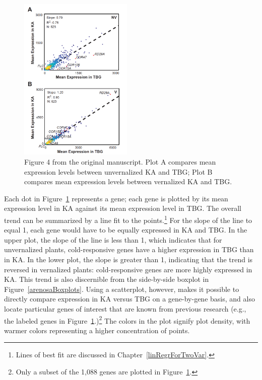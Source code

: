 \begin{figure}[h!]
	\centering
	\includegraphics[width=0.48\textwidth]{ch_intro_to_data_oi_biostat/figures/arenosaVisFigs/Fig4_PB}
	\caption{Figure 4 from the original manuscript. Plot A compares mean expression levels between unvernalized KA and TBG;  Plot B compares mean expression levels between vernalized KA and TBG.}
	\label{arenosaFig4PB}
\end{figure}

Each dot in Figure~\ref{arenosaFig4PB} represents a gene; each gene is plotted by its mean expression level in KA against its mean expression level in TBG. The overall trend can be summarized by a line fit to the points.\footnote{Lines of best fit are discussed in Chapter~\ref{linRegrForTwoVar}.} For the slope of the line to equal 1, each gene would have to be equally expressed in KA and TBG. In the upper plot, the slope of the line is less than 1, which indicates that for unvernalized plants, cold-responsive genes have a higher expression in TBG than in KA. In the lower plot, the slope is greater than 1, indicating that the trend is reversed in vernalized plants: cold-responsive genes are more highly expressed in KA. This trend is also discernible from the side-by-side boxplot in Figure~\ref{arenosaBoxplots}. Using a scatterplot, however, makes it possible to directly compare expression in KA versus TBG on a gene-by-gene basis, and also locate particular genes of interest that are known from previous research (e.g., the labeled genes in Figure~\ref{arenosaFig4PB}.)\footnote{Only a subset of the 1,088 genes are plotted in Figure~\ref{arenosaFig4PB}.} The colors in the plot signify plot density, with warmer colors representing a higher concentration of points.

